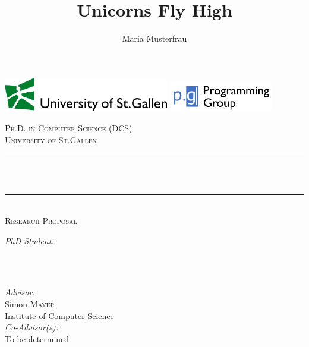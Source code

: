 \documentclass[a4paper,11pt]{article}
\author{Maria Musterfrau}
\title{Unicorns Fly High}
\begin{document}
\begin{titlepage}

\newcommand{\HRule}{\rule{\linewidth}{0.5mm}}
\setlength{\topmargin}{0in}
\center
\includegraphics[height=1.5cm]{logos/hsg.pdf}
\hfill
\includegraphics[height=1.3cm,trim=0 4mm 0 4mm]{logos/prg-grp.pdf}


\vfill
\textsc{\Large Ph.D. in Computer Science (DCS)} \\[0.5cm]
\textsc{\LARGE University of St.Gallen}\\[2.0cm]


\HRule \\[0.6cm]
\huge \textbf{\thetitle}\\[0.4cm]
\HRule \\[0.4cm]

\textsc{\Large Research Proposal}
\vfill


\begin{minipage}{0.4\textwidth}
\begin{flushleft} \large
\emph{PhD Student:}\\
\theauthor \\ 
\end{flushleft}
\end{minipage}
~
\begin{minipage}{0.5\textwidth}
\begin{flushright} \large
\emph{Advisor:} \\
Simon \textsc{Mayer} \\
Institute of Computer Science\\[0.5cm]
\emph{Co-Advisor(s):} \\
To be determined
\end{flushright}
\end{minipage}\\[2cm]


\end{titlepage}
\end{document}
